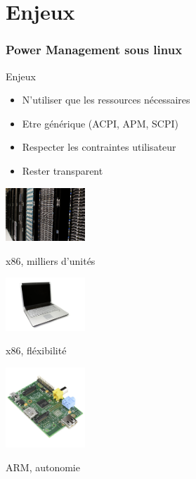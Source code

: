 \section{Enjeux}

\begin{frame}
	\frametitle{Power Management sous linux}
	\begin{block}{Enjeux}
		\begin{itemize}
			\item N'utiliser que les ressources nécessaires
			\item Etre générique (ACPI, APM, SCPI)
			\item Respecter les contraintes utilisateur
			\item Rester transparent
		\end{itemize}
	\end{block}
	\begin{minipage}[t]{0.30\linewidth}
		\begin{center}
			\includegraphics[width=3cm]{img/server.jpg}

			\small{x86, milliers d'unités}
		\end{center}
	\end{minipage}
	\begin{minipage}[t]{0.30\linewidth}
		\begin{center}
			\includegraphics[width=3cm]{img/laptop.jpg}

			\small{x86, fléxibilité}
		\end{center}
	\end{minipage}
	\begin{minipage}[t]{0.30\linewidth}
		\begin{center}
			\includegraphics[width=3cm]{img/raspi.jpg}

			\small{ARM, autonomie}
		\end{center}
	\end{minipage}
\end{frame}

